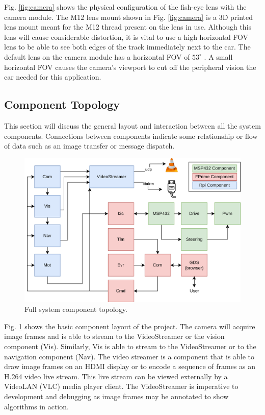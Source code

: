 \documentclass{article}
\begin{document}
Fig. \ref{fig:camera} shows the physical configuration of the fish-eye lens
with the camera module. The M12 lens mount shown in Fig. \ref{fig:camera} is a 3D printed lens mount meant for the M12 thread present on the lens in use. Although this lens will cause considerable distortion, it is vital to use a high horizontal FOV lens to be able to see both edges of the track immediately next to the car. The default lens on the camera module has a horizontal FOV of $53^{\circ}$ \cite{b6}. A small horizontal FOV causes the camera's viewport to cut off the peripheral vision the car needed for this application.

\subsection{Component Topology}

This section will discuss the general layout and interaction between all the system components. Connections between components indicate some relationship or flow of data such as an image transfer or message dispatch.

\begin{figure}[htb]
	\centering
	\centerline{\includegraphics[width=1.0\linewidth]{block}}
	\caption{Full system component topology.}
	\label{fig:block}
\end{figure}

Fig. \ref{fig:block} shows the basic component layout of the project. The camera will acquire image frames and is able to stream to the VideoStreamer or the vision component (Vis). Similarly, Vis is able to stream to the VideoStreamer or to the navigation component (Nav). The video streamer is a component that is able to draw image frames on an HDMI display or to encode a sequence of frames as an H.264 video live stream. This live stream can be viewed externally by a VideoLAN (VLC) media player client. The VideoStreamer is imperative to development and debugging as image frames may be annotated to show algorithms in action.
\end{document}
